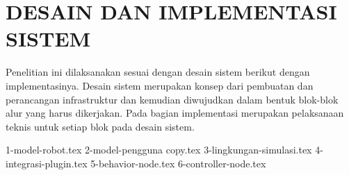 \chapter{DESAIN DAN IMPLEMENTASI SISTEM}
\label{chap:desainimplementasi}

Penelitian ini dilaksanakan sesuai dengan desain sistem berikut dengan implementasinya.
Desain sistem merupakan konsep dari pembuatan dan perancangan infrastruktur dan kemudian diwujudkan dalam bentuk blok-blok alur yang harus dikerjakan.
Pada bagian implementasi merupakan pelaksanaan teknis untuk setiap blok pada desain sistem.
\textcolor{red}{\lipsum[1][1-5]}

{1-model-robot.tex}
{2-model-pengguna copy.tex}
{3-lingkungan-simulasi.tex}
{4-integrasi-plugin.tex}
{5-behavior-node.tex}
{6-controller-node.tex}
